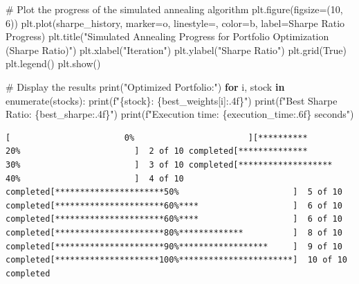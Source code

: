 \documentclass[
  letterpaper,
  DIV=11,
  numbers=noendperiod]{scrreprt}
\newenvironment{Shaded}{\begin{snugshade}}{\end{snugshade}}
\newcommand{\BuiltInTok}[1]{\textcolor[rgb]{0.00,0.23,0.31}{#1}}
\newcommand{\CommentTok}[1]{\textcolor[rgb]{0.37,0.37,0.37}{#1}}
\newcommand{\ControlFlowTok}[1]{\textcolor[rgb]{0.00,0.23,0.31}{\textbf{#1}}}
\newcommand{\DecValTok}[1]{\textcolor[rgb]{0.68,0.00,0.00}{#1}}
\newcommand{\KeywordTok}[1]{\textcolor[rgb]{0.00,0.23,0.31}{\textbf{#1}}}
\newcommand{\NormalTok}[1]{\textcolor[rgb]{0.00,0.23,0.31}{#1}}
\newcommand{\OperatorTok}[1]{\textcolor[rgb]{0.37,0.37,0.37}{#1}}
\newcommand{\SpecialCharTok}[1]{\textcolor[rgb]{0.37,0.37,0.37}{#1}}
\newcommand{\SpecialStringTok}[1]{\textcolor[rgb]{0.13,0.47,0.30}{#1}}
\newcommand{\StringTok}[1]{\textcolor[rgb]{0.13,0.47,0.30}{#1}}
\newcommand{\VariableTok}[1]{\textcolor[rgb]{0.07,0.07,0.07}{#1}}
\begin{document}
\begin{Shaded}
\begin{Highlighting}[]
\CommentTok{\# Plot the progress of the simulated annealing algorithm}
\NormalTok{plt.figure(figsize}\OperatorTok{=}\NormalTok{(}\DecValTok{10}\NormalTok{, }\DecValTok{6}\NormalTok{))}
\NormalTok{plt.plot(sharpe\_history, marker}\OperatorTok{=}\StringTok{\textquotesingle{}o\textquotesingle{}}\NormalTok{, linestyle}\OperatorTok{=}\StringTok{\textquotesingle{}{-}\textquotesingle{}}\NormalTok{, color}\OperatorTok{=}\StringTok{\textquotesingle{}b\textquotesingle{}}\NormalTok{, label}\OperatorTok{=}\StringTok{\textquotesingle{}Sharpe Ratio Progress\textquotesingle{}}\NormalTok{)}
\NormalTok{plt.title(}\StringTok{"Simulated Annealing Progress for Portfolio Optimization (Sharpe Ratio)"}\NormalTok{)}
\NormalTok{plt.xlabel(}\StringTok{"Iteration"}\NormalTok{)}
\NormalTok{plt.ylabel(}\StringTok{"Sharpe Ratio"}\NormalTok{)}
\NormalTok{plt.grid(}\VariableTok{True}\NormalTok{)}
\NormalTok{plt.legend()}
\NormalTok{plt.show()}

\CommentTok{\# Display the results}
\BuiltInTok{print}\NormalTok{(}\StringTok{"Optimized Portfolio:"}\NormalTok{)}
\ControlFlowTok{for}\NormalTok{ i, stock }\KeywordTok{in} \BuiltInTok{enumerate}\NormalTok{(stocks):}
    \BuiltInTok{print}\NormalTok{(}\SpecialStringTok{f"}\SpecialCharTok{\{}\NormalTok{stock}\SpecialCharTok{\}}\SpecialStringTok{: }\SpecialCharTok{\{}\NormalTok{best\_weights[i]}\SpecialCharTok{:.4f\}}\SpecialStringTok{"}\NormalTok{)}
\BuiltInTok{print}\NormalTok{(}\SpecialStringTok{f"Best Sharpe Ratio: }\SpecialCharTok{\{}\NormalTok{best\_sharpe}\SpecialCharTok{:.4f\}}\SpecialStringTok{"}\NormalTok{)}
\BuiltInTok{print}\NormalTok{(}\SpecialStringTok{f"Execution time: }\SpecialCharTok{\{}\NormalTok{execution\_time}\SpecialCharTok{:.6f\}}\SpecialStringTok{ seconds"}\NormalTok{)}
\end{Highlighting}
\end{Shaded}

\begin{verbatim}
[                       0%                       ][**********            20%                       ]  2 of 10 completed[**************        30%                       ]  3 of 10 completed[*******************   40%                       ]  4 of 10 completed[**********************50%                       ]  5 of 10 completed[**********************60%****                   ]  6 of 10 completed[**********************60%****                   ]  6 of 10 completed[**********************80%*************          ]  8 of 10 completed[**********************90%******************     ]  9 of 10 completed[*********************100%***********************]  10 of 10 completed
\end{verbatim}
\end{document}
